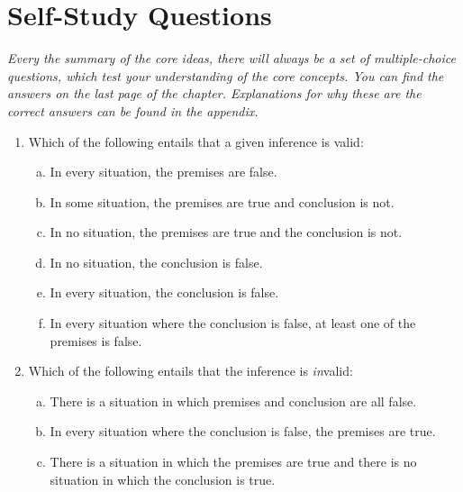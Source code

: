 \section{Self-Study Questions}

\emph{Every the summary of the core ideas, there will always be a set of multiple-choice questions, which test your understanding of the core concepts. You can find the answers on the last page of the chapter. Explanations for why these are the correct answers can be found in the appendix.}

	\begin{enumerate}[\thesection.1]
	
		\item Which of the following entails that a given inference is valid:
		
			\begin{enumerate}[(a)]
				
				\item In every situation, the premises are false.
				
				\item In some situation, the premises are true and conclusion is not.
				
				\item In no situation, the premises are true and the conclusion is not.
				
				\item In no situation, the conclusion is false.
				
				\item In every situation, the conclusion is false.
				
				\item In every situation where the conclusion is false, at least one of the premises is false.

			\end{enumerate}

		\item Which of the following entails that the inference is \emph{in}valid:
		
			\begin{enumerate}[(a)]
			
				\item There is a situation in which premises and conclusion are  all false.
				
				\item In every situation where the conclusion is false, the premises are true.

				\item There is a situation in which the premises are true and there is no situation in which the conclusion is true.
				

\end{enumerate}
\end{enumerate}
